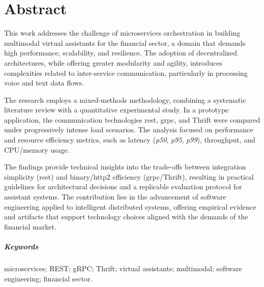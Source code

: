 \chapter*{Abstract}
This work addresses the challenge of microservices orchestration in building multimodal virtual assistants for the financial sector, a domain that demands high performance, scalability, and resilience. The adoption of decentralized architectures, while offering greater modularity and agility, introduces complexities related to inter-service communication, particularly in processing voice and text data flows.

The research employs a mixed-methods methodology, combining a systematic literature review with a quantitative experimental study. In a prototype application, the communication technologies \gls{rest}, \gls{grpc}, and Thrift were compared under progressively intense load scenarios. The analysis focused on performance and resource efficiency metrics, such as latency (\textit{p50}, \textit{p95}, \textit{p99}), throughput, and CPU/memory usage.

The findings provide technical insights into the trade-offs between integration simplicity (\gls{rest}) and binary/\acrshort{http}2 efficiency (\acrshort{grpc}/Thrift), resulting in practical guidelines for architectural decisions and a replicable evaluation protocol for assistant systems. The contribution lies in the advancement of software engineering applied to intelligent distributed systems, offering empirical evidence and artifacts that support technology choices aligned with the demands of the financial market.

\paragraph{Keywords} microservices; REST; gRPC; Thrift; virtual assistants; multimodal; software engineering; financial sector.
